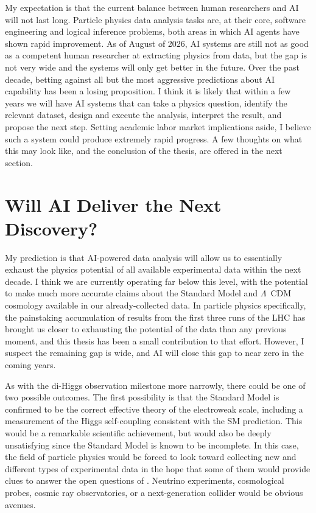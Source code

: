 My expectation is that the current balance between human researchers and AI will not last long.
Particle physics data analysis tasks are, at their core, software engineering and logical inference problems, both areas in which AI agents have shown rapid improvement.
As of August of 2026, AI systems are still not as good as a competent human researcher at extracting physics from data, but the gap is not very wide and the systems will only get better in the future.
Over the past decade, betting against all but the most aggressive predictions about AI capability has been a losing proposition.
I think it is likely that within a few years we will have AI systems that can take a physics question, identify the relevant dataset, design and execute the analysis, interpret the result, and propose the next step.
Setting academic labor market implications aside, I believe such a system could produce extremely rapid progress.
A few thoughts on what this may look like, and the conclusion of the thesis, are offered in the next section.

\section{Will AI Deliver the Next Discovery?}
\label{sec:conclusion-discovery}

My prediction is that AI-powered data analysis will allow us to essentially exhaust the physics potential of all available experimental data within the next decade.
I think we are currently operating far below this level, with the potential to make much more accurate claims about the Standard Model and $\Lambda$~CDM cosmology available in our already-collected data.
In particle physics specifically, the painstaking accumulation of results from the first three runs of the LHC has brought us closer to exhausting the potential of the data than any previous moment, and this thesis has been a small contribution to that effort.
However, I suspect the remaining gap is wide, and AI will close this gap to near zero in the coming years.

As with the di-Higgs observation milestone more narrowly, there could be one of two possible outcomes.
The first possibility is that the Standard Model is confirmed to be the correct effective theory of the electroweak scale, including a measurement of the Higgs self-coupling consistent with the SM prediction.
This would be a remarkable scientific achievement, but would also be deeply unsatisfying since the Standard Model is known to be incomplete.
In this case, the field of particle physics would be forced to look toward collecting new and different types of experimental data in the hope that some of them would provide clues to answer the open questions of .
Neutrino experiments, cosmological probes, cosmic ray observatories, or a next-generation collider would be obvious avenues.

